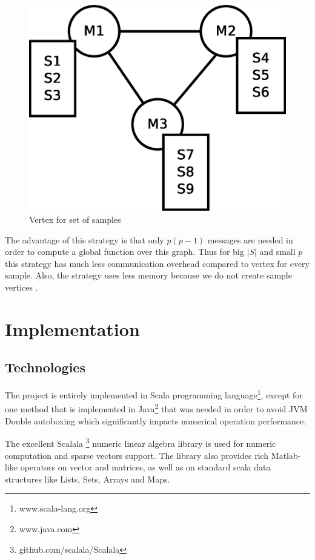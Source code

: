 \documentclass{report}
\begin{document}
\begin{figure}[!htb]
  \centering
  \includegraphics*[scale=0.45]{graph2.eps}
  \caption{Vertex for set of samples}
  \label{fig:vss:graph2}
\end{figure}

The advantage of this strategy is that only $p(p-1)$ messages are needed in order to compute a global function over this graph. Thus for big $|S|$ and small $p$ this strategy has much less communication overhead compared to vertex for every sample. Also, the strategy uses less memory because we do not create sample vertices .

\chapter{Implementation}

\section{Technologies}

The project is entirely implemented in Scala programming language\footnote{www.scala-lang.org}, except for one method that is implemented in Java\footnote{www.java.com} that was needed in order to avoid JVM Double autoboxing which significantly impacts numerical operation performance.

The excellent Scalala \footnote{github.com/scalala/Scalala} numeric linear algebra library is used for numeric computation and sparse vectors support. The library also provides rich Matlab-like operators on vector and matrices, as well as on standard scala data structures like Lists, Sets, Arrays and Maps.
 
\end{document}
